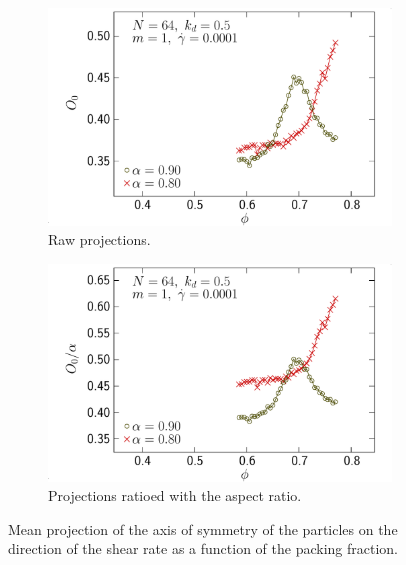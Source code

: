 \documentclass[class=report, float=false, crop=false]{standalone}
\begin{document}
\begin{figure}[h!]
\centering
    \begin{subfigure}[t]{0.49\textwidth}
        \centering
        \includegraphics[width=\textwidth]{figures/figs/ori0_phi_oblate_0064_KDk500_Ml100_GDh100}
        \caption{Raw projections.}
        \label{ori0_phi_oblate_0064_KDk500_Ml100_GDh100}
    \end{subfigure}
    \hfill
    \begin{subfigure}[t]{0.49\textwidth}
        \centering
        \includegraphics[width=\textwidth]{figures/figs/ori0al_phi_oblate_0064_KDk500_Ml100_GDh100}
        \caption{Projections ratioed with the aspect ratio.}
        \label{ori0al_phi_oblate_0064_KDk500_Ml100_GDh100}
    \end{subfigure}
    \caption{Mean projection of the axis of symmetry of the particles on the direction of the shear rate as a function of the packing fraction.}
    \label{ori_phi_oblate_0064}
\end{figure}
\end{document}
